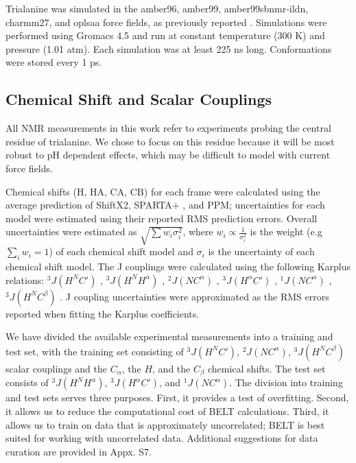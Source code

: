\documentclass[journal=jacsat,manuscript=article]{achemso}
\begin{document}
Trialanine was simulated in the amber96\cite{kollman1996}, amber99\cite{wang2000}, amber99sbnmr-ildn\cite{li2010}, charmm27\cite{mackerell2004extending,bjelkmar2010implementation}, and oplsaa\cite{kaminski2001evaluation} force fields, as previously reported \cite{beauchamp2012protein}.  Simulations were performed using Gromacs 4.5 \cite{hess2008} and run at constant temperature (300 K) and pressure (1.01 atm).  Each simulation was at least 225 ns long.  Conformations were stored every 1 ps.  

\subsection{Chemical Shift and Scalar Couplings}

All NMR measurements in this work refer to experiments \cite{Graf2007} probing the central residue of trialanine.  We chose to focus on this residue because it will be most robust to pH dependent effects, which may be difficult to model with current force fields.  

Chemical shifts (H, HA, CA, CB) for each frame were calculated using the average prediction of ShiftX2\cite{han2011shiftx2}, SPARTA+ \cite{Shen2010}, and PPM\cite{li2012ppm}; uncertainties for each model were estimated using their reported RMS prediction errors.  Overall uncertainties were estimated as $\sqrt{\sum w_i \sigma_i^2}$, where $w_i \propto \frac{1}{\sigma_i^2}$ is the weight (e.g $\sum_i w_i = 1$) of each chemical shift model and $\sigma_i$ is the uncertainty of each chemical shift model.  The J couplings were calculated using the following Karplus relations: $^3J(H^N C')$ \cite{Schmidt1999}, $^3J(H^N H^\alpha)$ \cite{vogeli2007limits}, $^2J(N C^\alpha)$ \cite{Graf2007}, $^3J(H^\alpha C')$ \cite{Schmidt1999}, $^1J(N C^\alpha)$ \cite{Graf2007}, $^3J(H^N C^\beta)$ \cite{vogeli2007limits}.  J coupling uncertainties were approximated as the RMS errors reported when fitting the Karplus coefficients.  

We have divided the available experimental measurements into a training and test set, with the training set consisting of $^3J(H^N C')$,  $^2J(N C^\alpha)$, $^3J(H^N C^\beta)$ scalar couplings and the $C_\alpha$, the $H$, and the $C_\beta$ chemical shifts.  The test set consists of $^3J(H^N H^\alpha)$, $^3J(H^\alpha C')$, and $^1J(N C^\alpha)$.  The division into training and test sets serves three purposes.  First, it provides a test of overfitting.  Second, it allows us to reduce the computational cost of BELT calculations.  Third, it allows us to train on data that is approximately uncorrelated; BELT is best suited for working with uncorrelated data.  Additional suggestions for data curation are provided in Appx. S7.  
\end{document}
